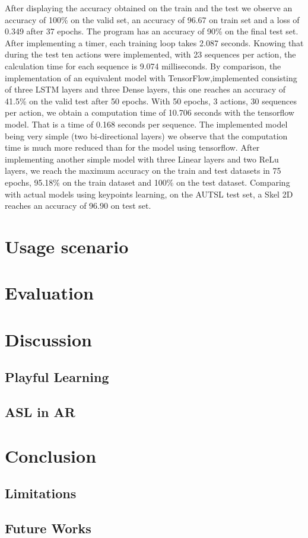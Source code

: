 After displaying the accuracy obtained on the train and the test we observe an accuracy of 100\% on the valid set, an accuracy of 96.67 on
train set and a loss of 0.349 after 37 epochs. The program has an accuracy
of 90\% on the final test set.
After implementing a timer, each training loop takes 2.087 seconds.
Knowing that during the test ten actions were implemented, with 23 sequences per action, the calculation time for each sequence is 9.074 milliseconds. By comparison, the implementation of an equivalent model
with TensorFlow,implemented consisting of three LSTM layers and three Dense layers, this one reaches an accuracy of 41.5\% on the valid test after
50 epochs.
With 50 epochs, 3 actions, 30 sequences per action, we obtain a computation time of 10.706 seconds with the tensorflow model. That is a time of 0.168 seconds per sequence.
The implemented model being very simple (two bi-directional layers) we observe that the computation time is much more reduced than for the model using tensorflow.
After implementing another simple model with three Linear layers and two ReLu layers, we reach the maximum accuracy on the train and test datasets in 75 epochs, 95.18\% on the train dataset and 100\% on the test dataset.
Comparing with actual models using keypoints learning, on the AUTSL test set, a Skel 2D reaches an accuracy of 96.90 on test set.

\section{Usage scenario}

\section{Evaluation}

\section{Discussion}

\subsection{Playful Learning}

\subsection{ASL in AR}

\section{Conclusion}

\subsection{Limitations}

\subsection{Future Works}
